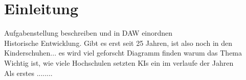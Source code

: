 \chapter{Einleitung}
Aufgabenstellung beschreiben und in DAW einordnen
\\
\noindent
Historische Entwicklung. Gibt es erst seit 25 Jahren, ist also noch in den Kinderschuhen... es wird viel geforscht
Diagramm finden warum das Thema Wichtig ist, wie viele Hochschulen setzten KIs ein im verlaufe der Jahren
\\
\noindent
Als erstes ........